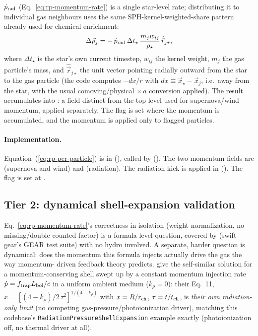 $\dot p_{\rm rad}$ (Eq.~\ref{eq:rp-momentum-rate}) is a single
star-level rate; distributing it to individual gas neighbours uses the
same SPH-kernel-weighted-share pattern already used for chemical
enrichment:
\begin{equation}
  \Delta\vec p_j = -\,\dot p_{\rm rad}\,\Delta t_\star\,
  \frac{m_j w_{ij}}{\rho_\star}\,\hat{\vec r}_{j\star},
  \label{eq:rp-per-particle}
\end{equation}
where $\Delta t_\star$ is the star's own current timestep, $w_{ij}$ the
kernel weight, $m_j$ the gas particle's mass, and $\hat{\vec r}_{j\star}$
the unit vector pointing radially outward from the star to the gas
particle (the code computes $-dx/r$ with $dx \equiv \vec x_\star -
\vec x_j$, i.e.\ away from the star, with the usual comoving/physical
$\times\,a$ conversion applied). The result accumulates into
: a field distinct from
the top-level  used for
supernova/wind momentum, applied separately. The flag  is
set where the momentum is accumulated, and the
momentum is applied only to flagged particles.

\paragraph{Implementation.} Equation~(\ref{eq:rp-per-particle}) is in
(), called by
 (). The two
momentum fields are 
(supernova and wind) and  (radiation). The radiation kick is applied
in  (). The
flag  is set at .

\subsection{Tier 2: dynamical shell-expansion validation}
\label{sec:rp-shell-tier2}

Eq.~\ref{eq:rp-momentum-rate}'s correctness in isolation (weight
normalization, no missing/double-counted factor) is a formula-level
question, covered by  (swift-gear's GEAR test suite) with no
hydro involved. A separate, harder question is dynamical: does the
momentum this formula injects actually drive the gas the way momentum-
driven feedback theory predicts. \citet{KrumholzMatzner2009} give the
self-similar solution for a momentum-conserving shell swept up by a
constant momentum injection rate $\dot p = f_{\rm trap}L_{\rm bol}/c$ in a
uniform ambient medium ($k_\rho=0$): their Eq.~11,
$x = [(4-k_\rho)/2\,\tau^2]^{1/(4-k_\rho)}$ with $x=R/r_{\rm ch}$,
$\tau=t/t_{\rm ch}$, is \emph{their own radiation-only limit} (no
competing gas-pressure/photoionization driver), matching this codebase's
\texttt{RadiationPressureShellExpansion} example exactly (photoionization
off, no thermal driver at all).


